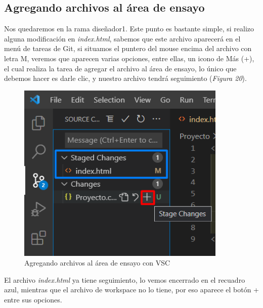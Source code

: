 \subsection{Agregando archivos al área de ensayo}
\hspace{0.55cm}Nos quedaremos en la rama diseñador1. Este punto es bastante simple, si realizo alguna modificación en \textit{index.html}, sabemos que este archivo aparecerá en el menú de tareas de Git, si situamos el puntero del mouse encima del archivo con letra M, veremos que aparecen varias opciones, entre ellas, un icono de Más (+), el cual realiza la tarea de agregar el archivo al área de ensayo, lo único que debemos hacer es darle clic, y nuestro archivo tendrá seguimiento (\textit{Figura 20}).
\begin{figure}[H]
    \begin{center}
        \caption{Agregando archivos al área de ensayo con VSC}
        \label{fig: 20}
        \includegraphics[width=10cm]{capturas/seguimiento_archivos.png}
    \end{center}
\end{figure}

El archivo \textit{index.html} ya tiene seguimiento, lo vemos encerrado en el recuadro azul, mientras que el archivo de workspace no lo tiene, por eso aparece el botón + entre sus opciones.



